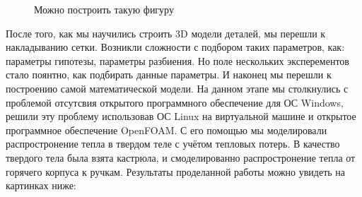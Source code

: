 \documentclass[a4paper,12pt]{article}
\theoremstyle{plain} %
\theoremstyle{definition} %
\theoremstyle{remark} %
\begin{document}
	\begin{figure}[h]
		\caption{Можно построить такую фигуру}
	\end{figure}
	
После того, как мы научились строить 3D модели деталей, мы перешли к накладыванию сетки. Возникли сложности с подбором таких параметров, как: параметры гипотезы, параметры разбиения. Но поле нескольких эксперементов стало поянтно, как подбирать данные параметры.
И наконец мы перешли к построению самой математической модели. На данном этапе мы столкнулись с проблемой отсутсвия открытого программного обеспечение для ОС Windows, решили эту проблему использовав ОС Linux на виртуальной машине и открытое программное обеспечение OpenFOAM. С его помощью мы моделировали распростронение тепла в твердом теле с учётом тепловых потерь. В качество твердого тела была взята кастрюла, и смоделированно распростронение тепла от горячего корпуса к ручкам. Результаты проделанной работы можно увидеть на картинках ниже:
\end{document}
